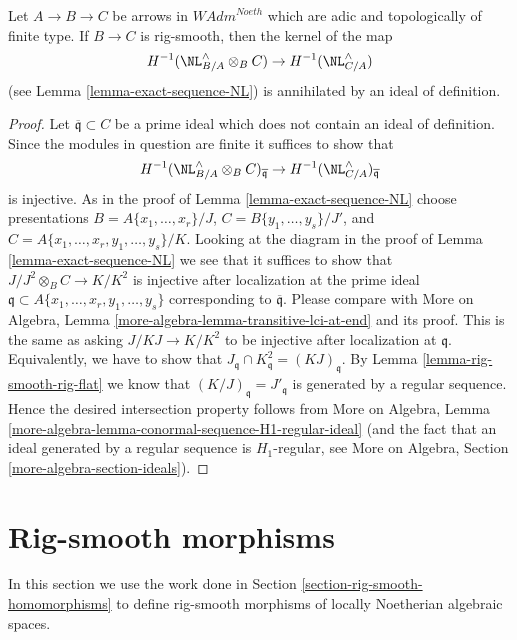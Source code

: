 \begin{lemma}
\label{lemma-exact-sequence-NL-rig-smooth}
Let $A \to B \to C$ be arrows in $\textit{WAdm}^{Noeth}$
which are adic and topologically of finite type. If $B \to C$
is rig-smooth, then the kernel of the map
$$
H^{-1}(\NL_{B/A}^\wedge \otimes_B C) \to H^{-1}(\NL_{C/A}^\wedge)
$$
(see Lemma \ref{lemma-exact-sequence-NL})
is annihilated by an ideal of definition.
\end{lemma}

\begin{proof}
Let $\overline{\mathfrak q} \subset C$ be a prime ideal which does not contain
an ideal of definition. Since the modules in question are finite
it suffices to show that
$$
H^{-1}(\NL_{B/A}^\wedge \otimes_B C)_{\overline{\mathfrak q}} \to
H^{-1}(\NL_{C/A}^\wedge)_{\overline{\mathfrak q}}
$$
is injective. As in the proof of Lemma \ref{lemma-exact-sequence-NL}
choose presentations $B = A\{x_1, \ldots, x_r\}/J$,
$C = B\{y_1, \ldots, y_s\}/J'$, and
$C = A\{x_1, \ldots, x_r, y_1, \ldots, y_s\}/K$.
Looking at the diagram in the proof of Lemma \ref{lemma-exact-sequence-NL}
we see that it suffices to show that $J/J^2 \otimes_B C \to K/K^2$
is injective after localization at the prime ideal
$\mathfrak q \subset A\{x_1, \ldots, x_r, y_1, \ldots, y_s\}$
corresponding to $\overline{\mathfrak q}$. Please compare with
More on Algebra, Lemma \ref{more-algebra-lemma-transitive-lci-at-end}
and its proof. This is the same as 
asking $J/KJ \to K/K^2$ to be injective after localization
at $\mathfrak q$. Equivalently, we have to show that
$J_\mathfrak q \cap K^2_\mathfrak q = (KJ)_\mathfrak q$.
By Lemma \ref{lemma-rig-smooth-rig-flat}
we know that $(K/J)_\mathfrak q = J'_\mathfrak q$
is generated by a regular sequence.
Hence the desired intersection property follows from
More on Algebra, Lemma
\ref{more-algebra-lemma-conormal-sequence-H1-regular-ideal}
(and the fact that an ideal generated by a regular sequence
is $H_1$-regular, see
More on Algebra, Section \ref{more-algebra-section-ideals}).
\end{proof}









\section{Rig-smooth morphisms}
\label{section-rig-smooth-morphisms}

\noindent
In this section we use the work done in
Section \ref{section-rig-smooth-homomorphisms}
to define rig-smooth morphisms of locally Noetherian algebraic spaces.

